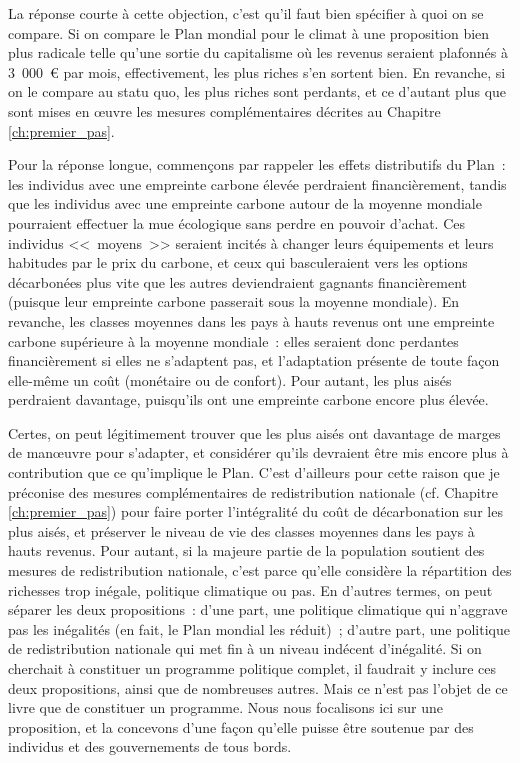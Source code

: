 \documentclass[a5paper,french,openany]{memoir}
\begin{document}
La réponse courte à cette objection, c'est qu'il faut bien spécifier à quoi on se compare. Si on compare le Plan mondial pour le climat à une proposition bien plus radicale telle qu'une sortie du capitalisme où les revenus seraient plafonnés à 3~000~\euro{} par mois, effectivement, les plus riches s'en sortent bien. En revanche, si on le compare au statu quo, les plus riches sont perdants, et ce d'autant plus que sont mises en œuvre les mesures complémentaires décrites au Chapitre \ref{ch:premier_pas}. 

Pour la réponse longue, commençons par rappeler les effets distributifs du Plan~: les individus avec une empreinte carbone élevée perdraient financièrement, tandis que les individus avec une empreinte carbone autour de la moyenne mondiale pourraient effectuer la mue écologique sans perdre en pouvoir d'achat. Ces individus <<~moyens~>> seraient incités à changer leurs équipements et leurs habitudes par le prix du carbone, et ceux qui basculeraient vers les options décarbonées plus vite que les autres deviendraient gagnants financièrement (puisque leur empreinte carbone passerait sous la moyenne mondiale). En revanche, les classes moyennes dans les pays à hauts revenus ont une empreinte carbone supérieure à la moyenne mondiale~: elles seraient donc perdantes financièrement si elles ne s'adaptent pas, et l'adaptation présente de toute façon elle-même un coût (monétaire ou de confort). Pour autant, les plus aisés perdraient davantage, puisqu'ils ont une empreinte carbone encore plus élevée. 

Certes, on peut légitimement trouver que les plus aisés ont davantage de marges de manœuvre pour s'adapter, et considérer qu'ils devraient être mis encore plus à contribution que ce qu'implique le Plan. C'est d'ailleurs pour cette raison que je préconise des mesures complémentaires de redistribution nationale (cf. Chapitre \ref{ch:premier_pas}) pour faire porter l'intégralité du coût de décarbonation sur les plus aisés, et préserver le niveau de vie des classes moyennes dans les pays à hauts revenus. Pour autant, si la majeure partie de la population soutient des mesures de redistribution nationale, c'est parce qu'elle considère la répartition des richesses trop inégale, politique climatique ou pas. En d'autres termes, on peut séparer les deux propositions~: d'une part, une politique climatique qui n'aggrave pas les inégalités (en fait, le Plan mondial les réduit)~; d'autre part, une politique de redistribution nationale qui met fin à un niveau indécent d'inégalité. Si on cherchait à constituer un programme politique complet, il faudrait y inclure ces deux propositions, ainsi que de nombreuses autres. Mais ce n'est pas l'objet de ce livre que de constituer un programme. Nous nous focalisons ici sur une proposition, et la concevons d'une façon qu'elle puisse être soutenue par des individus et des gouvernements de tous bords. 
\end{document}

